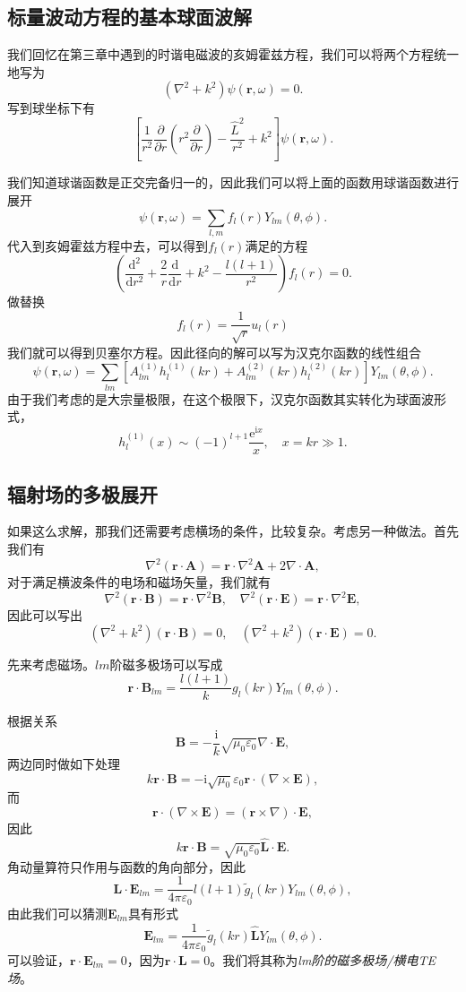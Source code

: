 \documentclass[UTF8]{ctexbook}
\newcommand{\e}{\mathrm{e}}
\renewcommand{\d}{\mathrm{d}}
\renewcommand{\b}{\boldsymbol}
\renewcommand{\i}{\mathrm{i}}
\renewcommand{\k}{\frac{1}{4\pi\varepsilon_0}}
\numberwithin{equation}{chapter}
\begin{document}
	\subsection{标量波动方程的基本球面波解}
	
	我们回忆在第三章中遇到的时谐电磁波的亥姆霍兹方程，我们可以将两个方程统一地写为
	\[(\nabla^2+k^2)\psi(\b{r},\omega)=0.\]
	写到球坐标下有
	\[\left[\frac{1}{r^2}\frac{\partial }{\partial r}\left(r^2\frac{\partial }{\partial r}\right)-\frac{\hat{L}^2}{r^2}+k^2\right]\psi(\b{r},\omega).\]
	
	我们知道球谐函数是正交完备归一的，因此我们可以将上面的函数用球谐函数进行展开
	\[\psi(\b{r},\omega)=\sum_{l,m}f_l(r)Y_{lm}(\theta,\phi).\]
	代入到亥姆霍兹方程中去，可以得到$f_l(r)$满足的方程
	\[\left(\frac{\d^2}{\d r^2}+\frac{2}{r}\frac{\d }{\d r}+k^2-\frac{l(l+1)}{r^2}\right)f_l(r)=0.\]
	做替换
	\[f_l(r)=\frac{1}{\sqrt{r}}u_l(r)\]
	我们就可以得到贝塞尔方程。因此径向的解可以写为汉克尔函数的线性组合
	\[\psi(\b{r},\omega)=\sum_{lm}\left[A_{lm}^{(1)}h_l^{(1)}(kr)+A_{lm}^{(2)}(kr)h_l^{(2)}(kr)\right]Y_{lm}(\theta,\phi).\]
	由于我们考虑的是大宗量极限，在这个极限下，汉克尔函数其实转化为球面波形式，
	\[h_l^{(1)}(x)\sim(-1)^{l+1}\frac{\e^{\i x}}{x},\quad x=kr\gg 1.\]
	
	\subsection{辐射场的多极展开}
	如果这么求解，那我们还需要考虑横场的条件，比较复杂。考虑另一种做法。首先我们有
	\[\nabla^2(\b{r}\cdot\b{A})=\b{r}\cdot\nabla^2\b{A}+2\nabla\cdot\b{A},\]
	对于满足横波条件的电场和磁场矢量，我们就有
	\[\nabla^2(\b{r}\cdot\b{B})=\b{r}\cdot\nabla^2\b{B},\quad \nabla^2(\b{r}\cdot\b{E})=\b{r}\cdot\nabla^2\b{E},\]
	因此可以写出
	\[(\nabla^2+k^2)(\b{r}\cdot\b{B})=0,\quad (\nabla^2+k^2)(\b{r}\cdot\b{E})=0.\]
	
	先来考虑磁场。$lm$阶磁多极场可以写成
	\[\b{r}\cdot\b{B}_{lm}=\frac{l(l+1)}{k}g_l(kr)Y_{lm}(\theta,\phi).\]
	
	根据关系
	\[\b{B}=-\frac{\i}{k}\sqrt{\mu_0\varepsilon_0}\nabla\cdot\b{E},\]
	两边同时做如下处理
	\[k\b{r}\cdot\b{B}=-\i\sqrt{\mu_0}{\varepsilon_0}\b{r}\cdot(\nabla\times\b{E}),\]
	而
	\[\b{r}\cdot(\nabla\times\b{E})=(\b{r}\times\nabla)\cdot\b{E},\]
	因此
	\[k\b{r}\cdot\b{B}=\sqrt{\mu_0\varepsilon_0}\hat{\b{L}}\cdot\b{E}.\]
	角动量算符只作用与函数的角向部分，因此
	\[\b{L}\cdot\b{E}_{lm}=\k l(l+1)\tilde{g}_l(kr)Y_{lm}(\theta,\phi),\]
	由此我们可以猜测$\b{E}_{lm}$具有形式
	\[\b{E}_{lm}=\k\tilde{g}_l(kr)\hat{\b{L}}Y_{lm}(\theta,\phi).\]
	可以验证，$\b{r}\cdot\b{E}_{lm}=0$，因为$\b{r}\cdot\b{L}=0$。我们将其称为\emph{lm阶的磁多极场/横电TE场}。
	
\end{document}
